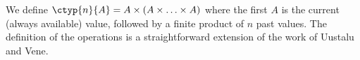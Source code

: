 We define $\ctyp{n}{A} = A \times (A \times \ldots \times A)$ where the first $A$ is the current
(always available) value, followed by a finite product of $n$ past values. The definition of the
operations is a straightforward extension of the work of Uustalu and Vene.




